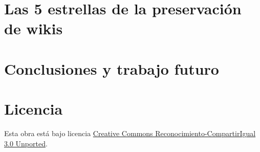 \documentclass[11pt,twocolumn]{article}
\begin{document}
\section{Las 5 estrellas de la preservación de wikis}

\section{Conclusiones y trabajo futuro}

        


\section{Licencia}
Esta obra está bajo licencia \href{http://creativecommons.org/licenses/by-sa/3.0/}{Creative Commons Reconocimiento-CompartirIgual 3.0 Unported}.
\end{document}
